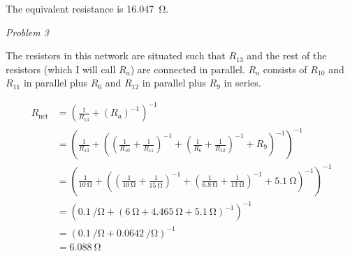 \documentclass{article}
\begin{document}
The equivalent resistance is \SI{16.047}{\ohm}.

\indent\textit{Problem 3}

The resistors in this network are situated such that $R_{13}$ and the
rest of the resistors (which I will call $R_a$) are connected in parallel.
$R_a$ consists of $R_{10}$ and $R_{11}$ in parallel plus $R_6$ and $R_{12}$ in
parallel plus $R_9$ in series.



\begin{align*}
    R_{\text{net}} &= \left( \frac1{R_{13}} + \left( R_a \right)^{-1} \right)^{-1}\\
    &= \left( \frac1{R_{13}}        + \left( \left( \frac1{R_{10}} + \frac1{R_{11}} \right)^{-1} +               \left( \frac1{R_6} + \frac1{R_{12}} \right)^{-1} + R_9 \right)^{-1} \right)^{-1}\\
    &= \left( \frac1{\SI{10}{\ohm}} + \left( \left( \frac1{\SI{10}{\ohm}} + \frac1{\SI{15}{\ohm}} \right)^{-1} + \left( \frac1{\SI{6.8}{\ohm}} + \frac1{\SI{13}{\ohm}}  \right)^{-1} + \SI{5.1}{\ohm} \right)^{-1}  \right)^{-1}\\
    &= \left( \SI{0.1}{\per\ohm} + \left( \SI{6}{\ohm} + \SI{4.465}{\ohm} + \SI{5.1}{\ohm} \right)^{-1} \right)^{-1}\\
    &= \left( \SI{0.1}{\per\ohm} + \SI{0.0642}{\per\ohm} \right)^{-1}\\
    &= \SI{6.088}{\ohm}
\end{align*}
\end{document}
